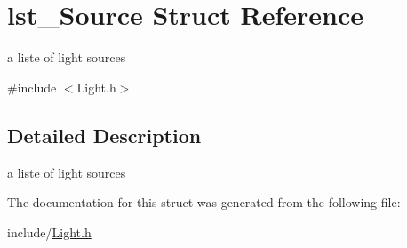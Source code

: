\hypertarget{structlst___source}{}\section{lst\+\_\+\+Source Struct Reference}
\label{structlst___source}


a liste of light sources  




{\ttfamily \#include $<$Light.\+h$>$}



\subsection{Detailed Description}
a liste of light sources 

The documentation for this struct was generated from the following file\+:\begin{DoxyCompactItemize}
\item 
include/\hyperlink{_light_8h}{Light.\+h}\end{DoxyCompactItemize}
